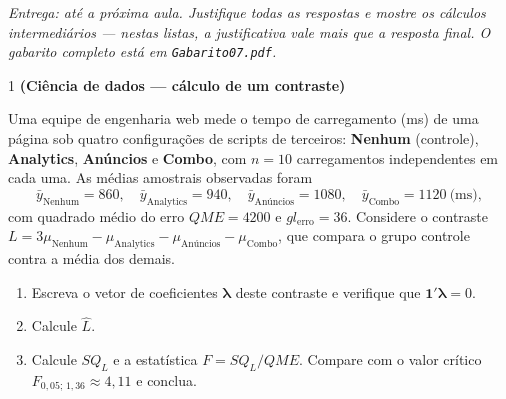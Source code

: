 \documentclass[11pt]{article}
\begin{document}

\noindent \textit{Entrega: até a próxima aula. Justifique todas as respostas e mostre os cálculos
intermediários --- nestas listas, a justificativa vale mais que a resposta final. O gabarito
completo está em \texttt{Gabarito07.pdf}.}

\begin{questao}{1} \textbf{(Ciência de dados --- cálculo de um contraste)}

Uma equipe de engenharia web mede o tempo de carregamento (ms) de uma página sob quatro
configurações de scripts de terceiros: \textbf{Nenhum} (controle), \textbf{Analytics},
\textbf{Anúncios} e \textbf{Combo}, com $n=10$ carregamentos independentes em cada uma. As médias
amostrais observadas foram
\[
\bar y_{\text{Nenhum}} = 860, \quad \bar y_{\text{Analytics}} = 940, \quad
\bar y_{\text{Anúncios}} = 1080, \quad \bar y_{\text{Combo}} = 1120 \ \text{(ms)},
\]
com quadrado médio do erro $QME = 4200$ e $gl_{\text{erro}} = 36$. Considere o contraste
$L = 3\mu_{\text{Nenhum}} - \mu_{\text{Analytics}} - \mu_{\text{Anúncios}} - \mu_{\text{Combo}}$,
que compara o grupo controle contra a média dos demais.

\begin{enumerate}[label=(\alph*)]
  \item Escreva o vetor de coeficientes $\boldsymbol\lambda$ deste contraste e verifique que
    $\mathbf 1'\boldsymbol\lambda = 0$.
  \item Calcule $\hat L$.
  \item Calcule $SQ_L$ e a estatística $F = SQ_L/QME$. Compare com o valor crítico
    $F_{0{,}05;\,1,36} \approx 4{,}11$ e conclua.
\end{enumerate}
\end{questao}
\end{document}
